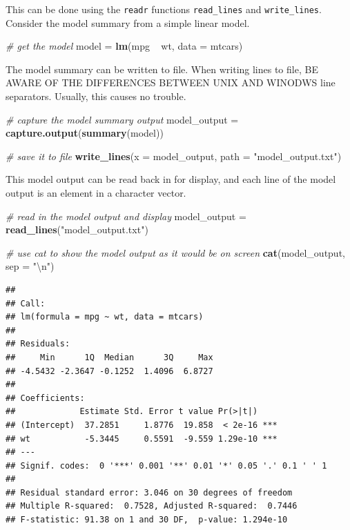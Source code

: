 \documentclass[]{book}
\newenvironment{Shaded}{}{}
\newcommand{\CharTok}[1]{\textcolor[rgb]{0.25,0.44,0.63}{#1}}
\newcommand{\CommentTok}[1]{\textcolor[rgb]{0.38,0.63,0.69}{\textit{#1}}}
\newcommand{\DataTypeTok}[1]{\textcolor[rgb]{0.56,0.13,0.00}{#1}}
\newcommand{\KeywordTok}[1]{\textcolor[rgb]{0.00,0.44,0.13}{\textbf{#1}}}
\newcommand{\NormalTok}[1]{#1}
\newcommand{\OperatorTok}[1]{\textcolor[rgb]{0.40,0.40,0.40}{#1}}
\newcommand{\StringTok}[1]{\textcolor[rgb]{0.25,0.44,0.63}{#1}}
\begin{document}
This can be done using the \texttt{readr} functions \texttt{read\_lines} and \texttt{write\_lines}. Consider the model summary from a simple linear model.

\begin{Shaded}
\begin{Highlighting}[]
\CommentTok{# get the model}
\NormalTok{model =}\StringTok{ }\KeywordTok{lm}\NormalTok{(mpg }\OperatorTok{~}\StringTok{ }\NormalTok{wt, }\DataTypeTok{data =}\NormalTok{ mtcars)}
\end{Highlighting}
\end{Shaded}

The model summary can be written to file. When writing lines to file, BE AWARE OF THE DIFFERENCES BETWEEN UNIX AND WINODWS line separators. Usually, this causes no trouble.

\begin{Shaded}
\begin{Highlighting}[]
\CommentTok{# capture the model summary output}
\NormalTok{model_output =}\StringTok{ }\KeywordTok{capture.output}\NormalTok{(}\KeywordTok{summary}\NormalTok{(model))}

\CommentTok{# save it to file}
\KeywordTok{write_lines}\NormalTok{(}\DataTypeTok{x =}\NormalTok{ model_output,}
  \DataTypeTok{path =} \StringTok{"model_output.txt"}\NormalTok{)}
\end{Highlighting}
\end{Shaded}

This model output can be read back in for display, and each line of the model output is an element in a character vector.

\begin{Shaded}
\begin{Highlighting}[]
\CommentTok{# read in the model output and display}
\NormalTok{model_output =}\StringTok{ }\KeywordTok{read_lines}\NormalTok{(}\StringTok{"model_output.txt"}\NormalTok{)}

\CommentTok{# use cat to show the model output as it would be on screen}
\KeywordTok{cat}\NormalTok{(model_output, }\DataTypeTok{sep =} \StringTok{"}\CharTok{\textbackslash{}n}\StringTok{"}\NormalTok{)}
\end{Highlighting}
\end{Shaded}

\begin{verbatim}
## 
## Call:
## lm(formula = mpg ~ wt, data = mtcars)
## 
## Residuals:
##     Min      1Q  Median      3Q     Max 
## -4.5432 -2.3647 -0.1252  1.4096  6.8727 
## 
## Coefficients:
##             Estimate Std. Error t value Pr(>|t|)    
## (Intercept)  37.2851     1.8776  19.858  < 2e-16 ***
## wt           -5.3445     0.5591  -9.559 1.29e-10 ***
## ---
## Signif. codes:  0 '***' 0.001 '**' 0.01 '*' 0.05 '.' 0.1 ' ' 1
## 
## Residual standard error: 3.046 on 30 degrees of freedom
## Multiple R-squared:  0.7528, Adjusted R-squared:  0.7446 
## F-statistic: 91.38 on 1 and 30 DF,  p-value: 1.294e-10
\end{verbatim}
\end{document}
